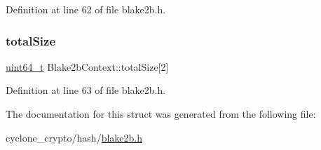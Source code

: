 Definition at line 62 of file blake2b.\+h.

\mbox{\label{structBlake2bContext_ad9830491b846cc33a13f9c0f1c511647}} 
\subsubsection{\texorpdfstring{total\+Size}{totalSize}}
{\footnotesize\ttfamily \hyperlink{stdint_8h_aec6fcb673ff035718c238c8c9d544c47}{uint64\+\_\+t} Blake2b\+Context\+::total\+Size\mbox{[}2\mbox{]}}



Definition at line 63 of file blake2b.\+h.



The documentation for this struct was generated from the following file\+:\begin{DoxyCompactItemize}
\item 
cyclone\+\_\+crypto/hash/\hyperlink{blake2b_8h}{blake2b.\+h}\end{DoxyCompactItemize}
